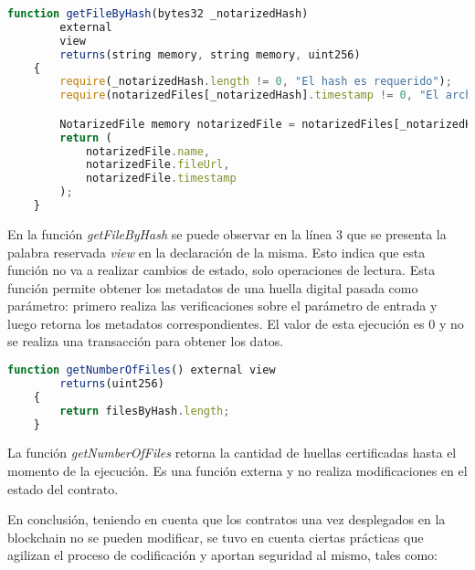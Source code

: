 \begin{minipage}{\linewidth}
  \begin{lstlisting}[frame=single, belowskip=1em, aboveskip=2em,  language=javascript, captionpos=b, caption=Función getFileByHash, label={lst:post_archivo}]
    function getFileByHash(bytes32 _notarizedHash)
        external
        view
        returns(string memory, string memory, uint256)
    {
        require(_notarizedHash.length != 0, "El hash es requerido");
        require(notarizedFiles[_notarizedHash].timestamp != 0, "El archivo no existe");

        NotarizedFile memory notarizedFile = notarizedFiles[_notarizedHash];
        return (
            notarizedFile.name,
            notarizedFile.fileUrl,
            notarizedFile.timestamp
        );
    }
  \end{lstlisting}
\end{minipage}

En la función \textit{getFileByHash} se puede observar en la línea 3 que se presenta la palabra reservada \textit{view} en la declaración de la misma. Esto indica que esta función no va a realizar cambios de estado, solo operaciones de lectura. Esta función permite obtener los metadatos de una huella digital pasada como parámetro: primero realiza las verificaciones sobre el parámetro de entrada y luego retorna los metadatos correspondientes. El valor de esta ejecución es 0 y no se realiza una transacción para obtener los datos.

\begin{minipage}{\linewidth}
  \begin{lstlisting}[frame=single, belowskip=1em, aboveskip=2em,  language=javascript, captionpos=b, caption=Función getNumberOfFiles, label={lst:post_archivo}]
    function getNumberOfFiles() external view
        returns(uint256)
    {
        return filesByHash.length;
    }
  \end{lstlisting}
\end{minipage}

La función \textit{getNumberOfFiles} retorna la cantidad de huellas certificadas hasta el momento de la ejecución. Es una función externa y no realiza modificaciones en el estado del contrato.

En conclusión, teniendo en cuenta que los contratos una vez desplegados en la blockchain no se pueden modificar, se tuvo en cuenta ciertas prácticas que agilizan el proceso de codificación y aportan seguridad al mismo, tales como:

